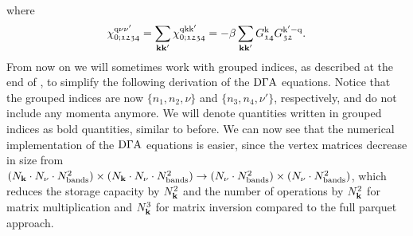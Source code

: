 \documentclass[../../main.tex]{subfiles}
\begin{document}
where
\begin{align}
	\chi_{0;\mathfrak{1234}}^{\text{q}\nu\nu'}=\sum_{\textbf{kk}'}\chi_{0;\mathfrak{1234}}^{\text{q}\text{k}\text{k}'}=-\beta\sum_{\textbf{kk}'}G^{\text{k}}_{\mathfrak{14}}G^{\text{k}'-\text{q}}_{\mathfrak{32}}.
\end{align}
From now on we will sometimes work with grouped indices, as described at the end of , to simplify the following derivation of the $\text{D}\Gamma\text{A}$ equations. Notice that the grouped indices are now $\{ n_1,n_2,\nu \}$ and $\{ n_3,n_4,\nu' \}$, respectively, and do not include any momenta anymore. We will denote quantities written in grouped indices as bold quantities, similar to before. We can now see that the numerical implementation of the $\text{D}\Gamma\text{A}$ equations is easier, since the vertex matrices decrease in size from $(N_{\textbf{k}}\cdot N_{\nu} \cdot N_{\text{bands}}^2)\times(N_{\textbf{k}}\cdot N_{\nu} \cdot N_{\text{bands}}^2) \to (N_{\nu} \cdot N_{\text{bands}}^2)\times(N_{\nu} \cdot N_{\text{bands}}^2)$, which reduces the storage capacity by $N_{\textbf{k}}^2$ and the number of operations by $N_{\textbf{k}}^2$ for matrix multiplication and $N_{\textbf{k}}^3$ for matrix inversion compared to the full parquet approach.
\end{document}
